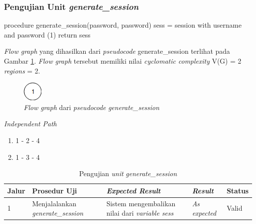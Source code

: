 \subsubsection{Pengujian Unit \emph{generate\_session}}

\begin{code}
\begin{ignasicblock}[title=generate\_session,minted language=text]
procedure generate_session(password, password)
    sess = session with username and password   (1)
return sess
\end{ignasicblock}
\label{pc:generate_session}
\end{code}

\par\null\par
\noindent
\emph{Flow graph} yang dihasilkan dari \emph{pseudocode}
generate\_session terlihat pada Gambar \ref{cfg:generate_session}. \emph{Flow graph} tersebut memiliki nilai
\emph{cyclomatic complexity} V(G) = 2 \emph{regions} = 2.

\begin{figure}[H]
  \centering
  \includegraphics[width=.06\linewidth]{img/test-case/1node}
  \caption{\emph{Flow graph} dari \emph{pseudocode} \emph{generate\_session}}
  \label{cfg:generate_session}
\end{figure}

\noindent
\emph{Independent Path}

\begin{enumerate}
\item 1 - 2 - 4
\item 1 - 3 - 4
\end{enumerate}


\begin{longtable}{|P{.06\textwidth}|P{.29\textwidth}|P{.29\textwidth}|P{.12\textwidth}|P{.08\textwidth}|}
  \caption{Pengujian \emph{unit} \emph{generate\_session}} \label{jalur:generate_session}\\
  \hline
  \textbf{Jalur} & \textbf{Prosedur Uji} & \textbf{\emph{Expected Result}}
  & \textbf{\emph{Result}} & \textbf{Status} \\\hline
  1 & Menjalalankan \emph{generate\_session} & Sistem mengembalikan nilai dari \emph{variable sess}
  & \emph{As expected} & Valid \\\hline
\end{longtable}

